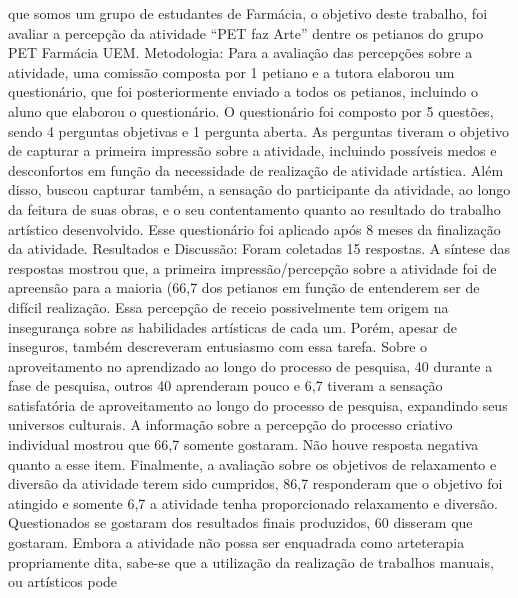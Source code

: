 que somos um grupo de estudantes de Farmácia, o objetivo deste trabalho, foi avaliar a percepção 
da atividade “PET faz Arte” dentre os petianos do grupo PET Farmácia UEM. Metodologia: Para 
a avaliação das percepções sobre a atividade, uma comissão composta por 1 petiano e a tutora 
elaborou um questionário, que foi posteriormente enviado a todos os petianos, incluindo o aluno 
que elaborou o questionário. O questionário foi composto por 5 questões, sendo 4 perguntas 
objetivas e 1 pergunta aberta. As perguntas tiveram o objetivo de capturar a primeira impressão 
sobre a atividade, incluindo possíveis medos e desconfortos em função da necessidade de 
realização de atividade artística. Além disso, buscou capturar também, a sensação do participante 
da atividade, ao longo da feitura de suas obras, e o seu contentamento quanto ao resultado do 
trabalho artístico desenvolvido. Esse questionário foi aplicado após 8 meses da finalização da 
atividade. Resultados e Discussão: Foram coletadas 15 respostas. A síntese das respostas mostrou
que, a primeira impressão/percepção sobre a atividade foi de apreensão para a maioria (66,7%
dos petianos em função de entenderem ser de difícil realização. Essa percepção de receio 
possivelmente tem origem na insegurança sobre as habilidades artísticas de cada um. Porém, 
apesar de inseguros, também descreveram entusiasmo com essa tarefa. Sobre o aproveitamento no 
aprendizado ao longo do processo de pesquisa, 40%
durante a fase de pesquisa, outros 40%
aprenderam pouco e 6,7%
tiveram a sensação satisfatória de aproveitamento ao longo do processo de pesquisa, expandindo 
seus universos culturais. A informação sobre a percepção do processo criativo individual mostrou 
que 66,7%
somente gostaram. Não houve resposta negativa quanto a esse item. Finalmente, a avaliação sobre 
os objetivos de relaxamento e diversão da atividade terem sido cumpridos, 86,7%
responderam que o objetivo foi atingido e somente 6,7%
a atividade tenha proporcionado relaxamento e diversão. Questionados se gostaram dos resultados
finais produzidos, 60%
disseram que gostaram. Embora a atividade não possa ser enquadrada como arteterapia 
propriamente dita, sabe-se que a utilização da realização de trabalhos manuais, ou artísticos pode 
